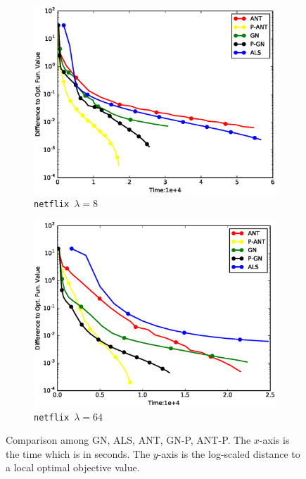 \documentclass[11pt,twoside]{article}
\begin{document}
\begin{figure}
\begin{subfigure}[b]{0.32\textwidth}
        \includegraphics[width=1.03\textwidth]{./figures/nf.8.obj.eps}
        \caption{\tt netflix $\lambda=8$}
    \end{subfigure}
    \begin{subfigure}[b]{0.32\textwidth}
        \centering
        \includegraphics[width=1.03\textwidth]{./figures/nf.64.obj.eps}
        \caption{\tt netflix $\lambda=64$}
    \end{subfigure}
        \caption{Comparison among GN, ALS, ANT, GN-P, ANT-P.
             The $x$-axis is the time which is in seconds.
             The $y$-axis is the log-scaled distance to a local optimal objective value.}
    \label{fig:objvstime}
\end{figure}
\end{document}
